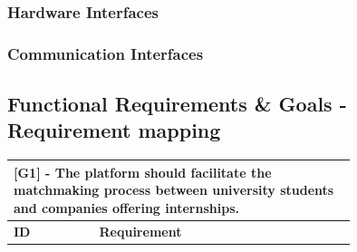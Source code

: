 \documentclass[12pt]{article}
\begin{document}
\subsubsection{Hardware Interfaces}

\subsubsection{Communication Interfaces}

\subsection{Functional Requirements \& Goals - Requirement mapping}

    \begin{center}
        \begin{longtable}{|l|p{0.75\linewidth}|}
            \hline
            \multicolumn{2}{|p{\linewidth}|}{\textbf{[G1] - The platform should facilitate the matchmaking process between university students and companies offering internships.}} \\
            \hline
             \textbf{ID} & \textbf{Requirement}  \\
            \hline
        \end{longtable}
    \end{center}
\end{document}
